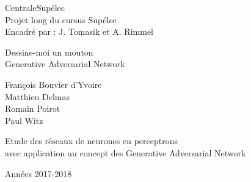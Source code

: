 
\begin{titlepage}

\setlength{\hoffset}{-1in}
\setlength{\voffset}{-1in}
\setlength{\topmargin}{1.5cm}
\setlength{\headheight}{0.5cm}
\setlength{\headsep}{1cm}
\setlength{\oddsidemargin}{3cm}
\setlength{\evensidemargin}{3cm}
\setlength{\footskip}{1.5cm}
\enlargethispage{1cm}

\fontsize{12pt}{14pt}
\selectfont

\begin{center}


\vspace{0.5cm}

CentraleSupélec\\
Projet long du cursus Supélec\\
Encadré par : J. Tomasik et A. Rimmel

\vspace{3.5cm}

\fontsize{17.28pt}{21pt}
\selectfont

Dessine-moi un mouton\\
Generative Adversarial Network

\fontsize{12pt}{14pt}
\selectfont

\vspace{.6cm}



\vspace{.4cm}



\vspace{3.5cm}

François Bouvier d'Yvoire\\
Matthieu Delmas \\
Romain Poirot \\
Paul Witz

\vspace{2cm}

Etude des réseaux de neurones en perceptrons \\ avec application au concept des Generative Adversarial Network


\vspace{1cm}

Années 2017-2018

\end{center}
\end{titlepage}
